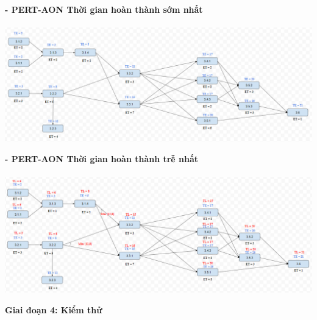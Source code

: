 \documentclass[12pt]{article}
\begin{document}
\hspace{1cm}\textbf{- PERT-AON Thời gian hoàn thành sớm nhất \\\\} 
\vspace*{0.5cm}    
\hspace{0.7cm}\includegraphics[width=14.5cm]{PERT3_1.png}
\vspace{0.5cm}  

\hspace{1cm}\textbf{- PERT-AON Thời gian hoàn thành trễ nhất \\\\} 
\vspace*{0.5cm}    
\hspace{0.7cm}\includegraphics[width=14.5cm]{PERT3_2.png}
\vspace{0.5cm}  

\begin{center}
    \textbf{Giai đoạn 4: Kiểm thử}
\end{center}
 
\end{document}
